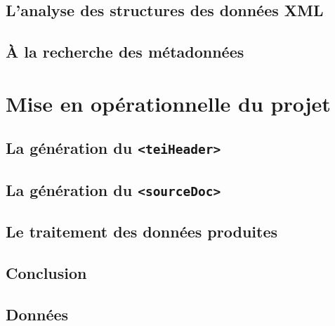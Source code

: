 \documentclass[a4paper,12pt,twoside]{book}
\begin{document}
	\chapter{L'analyse des structures des données XML}
	
	\label{chap:xml}
	
	\chapter{À la recherche des métadonnées}
	
	\label{chap:metadata}
	
	\part{Mise en opérationnelle du projet}
	\label{part3}
	
	\chapter{La génération du \texttt{<teiHeader>}}
	
	\label{chap:header}
	
	\chapter{La génération du \texttt{<sourceDoc>}}
	
	\label{chap.8}
	
	\chapter{Le traitement des données produites}
	
	\label{chap.9}
	
	\chapter*{Conclusion}
	
	
	
	\appendix
	\chapter{Données}
	
	
	\backmatter


	\listoffigures

	\listoftables

	\tableofcontents
	
\end{document}
